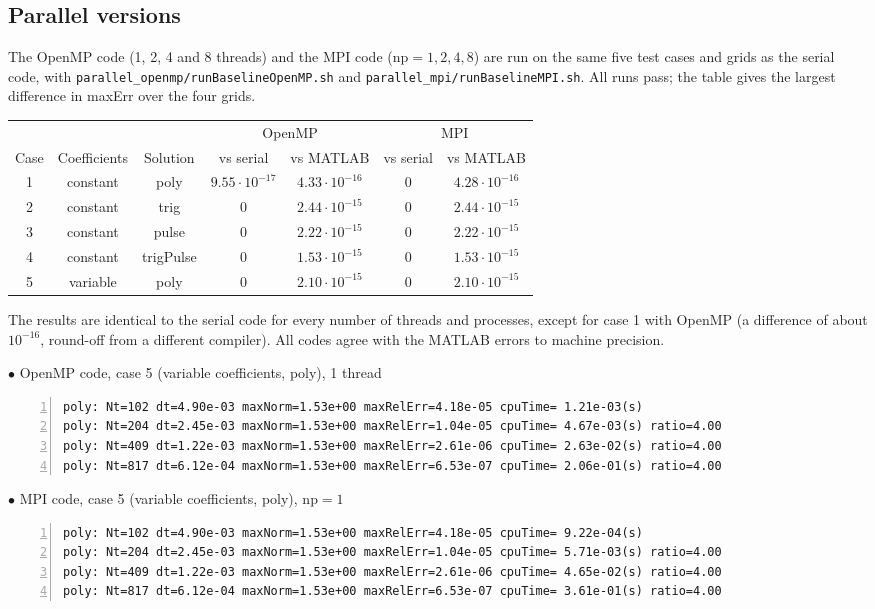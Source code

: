 \documentclass[11pt]{article}
\begin{document}
\subsection{Parallel versions}
The OpenMP code (1, 2, 4 and 8 threads) and the MPI code ($\mbox{np}=1,2,4,8$) are run on the same five test cases and grids as the serial code, with \texttt{parallel\_openmp/runBaselineOpenMP.sh} and \texttt{parallel\_mpi/runBaselineMPI.sh}. All runs pass; the table gives the largest difference in maxErr over the four grids.
\begin{table}[H]\footnotesize
\begin{center}
\begin{tabular}{|c|c|c|c|c|c|c|} \hline
 & & & \multicolumn{2}{c|}{OpenMP} & \multicolumn{2}{c|}{MPI} \\ \cline{4-7}
Case & Coefficients & Solution & vs serial & vs MATLAB & vs serial & vs MATLAB \\ \hline
1 & constant & poly & $9.55\cdot 10^{-17}$ & $4.33\cdot 10^{-16}$ & $0$ & $4.28\cdot 10^{-16}$ \\
2 & constant & trig & $0$ & $2.44\cdot 10^{-15}$ & $0$ & $2.44\cdot 10^{-15}$ \\
3 & constant & pulse & $0$ & $2.22\cdot 10^{-15}$ & $0$ & $2.22\cdot 10^{-15}$ \\
4 & constant & trigPulse & $0$ & $1.53\cdot 10^{-15}$ & $0$ & $1.53\cdot 10^{-15}$ \\
5 & variable & poly & $0$ & $2.10\cdot 10^{-15}$ & $0$ & $2.10\cdot 10^{-15}$ \\
\hline
\end{tabular}
\end{center}
\end{table}
The results are identical to the serial code for every number of threads and processes, except for case 1 with OpenMP (a difference of about $10^{-16}$, round-off from a different compiler). All codes agree with the MATLAB errors to machine precision.

$\bullet$ OpenMP code, case 5 (variable coefficients, poly), 1 thread
\begin{Verbatim}[fontsize=\footnotesize,formatcom=\color{blue},frame=single,framerule=1pt,numbers=left]
poly: Nt=102 dt=4.90e-03 maxNorm=1.53e+00 maxRelErr=4.18e-05 cpuTime= 1.21e-03(s)
poly: Nt=204 dt=2.45e-03 maxNorm=1.53e+00 maxRelErr=1.04e-05 cpuTime= 4.67e-03(s) ratio=4.00
poly: Nt=409 dt=1.22e-03 maxNorm=1.53e+00 maxRelErr=2.61e-06 cpuTime= 2.63e-02(s) ratio=4.00
poly: Nt=817 dt=6.12e-04 maxNorm=1.53e+00 maxRelErr=6.53e-07 cpuTime= 2.06e-01(s) ratio=4.00
\end{Verbatim}
$\bullet$ MPI code, case 5 (variable coefficients, poly), $\mbox{np}=1$
\begin{Verbatim}[fontsize=\footnotesize,formatcom=\color{blue},frame=single,framerule=1pt,numbers=left]
poly: Nt=102 dt=4.90e-03 maxNorm=1.53e+00 maxRelErr=4.18e-05 cpuTime= 9.22e-04(s)
poly: Nt=204 dt=2.45e-03 maxNorm=1.53e+00 maxRelErr=1.04e-05 cpuTime= 5.71e-03(s) ratio=4.00
poly: Nt=409 dt=1.22e-03 maxNorm=1.53e+00 maxRelErr=2.61e-06 cpuTime= 4.65e-02(s) ratio=4.00
poly: Nt=817 dt=6.12e-04 maxNorm=1.53e+00 maxRelErr=6.53e-07 cpuTime= 3.61e-01(s) ratio=4.00
\end{Verbatim}
\end{document}
